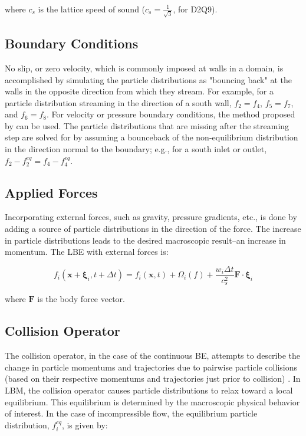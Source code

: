 \documentclass{article}
\newcommand{\pos}{\mathbf{x}}
\newcommand{\pvel}{\boldsymbol{\xi}}
\begin{document}
\noindent where $c_s$ is the lattice speed of sound ($c_s = \frac{1}{\sqrt{3}}$, for D2Q9).

\subsection{Boundary Conditions}

No slip, or zero velocity, which is commonly imposed at walls in a domain, is accomplished by simulating the particle distributions as "bouncing back" at the walls in the opposite direction from which they stream.
For example, for a particle distribution streaming in the direction of a south wall, $f_2 = f_4$, $f_5 = f_7$, and $f_6 = f_8$.
For velocity or pressure boundary conditions, the method proposed by \citet{zou1997pressure} can be used.
The particle distributions that are missing after the streaming step are solved for by assuming a bounceback of the non-equilibrium distribution in the direction normal to the boundary; e.g., for a south inlet or outlet, $f_2 - f_2^{eq} = f_4 - f_4^{eq}$.

\subsection{Applied Forces}

Incorporating external forces, such as gravity, pressure gradients, etc., is done by adding a source of particle distributions in the direction of the force.
The increase in particle distributions leads to the desired macroscopic result--an increase in momentum.
The LBE with external forces is:

\begin{equation}
f_i(\pos + \pvel_i, t + \Delta t) = f_i(\pos, t) + \Omega_i(f) + \frac{w_i \Delta t}{c_s^2} \mathbf{F} \cdot \pvel_i
\end{equation}

\noindent where $\mathbf{F}$ is the body force vector.

\subsection{Collision Operator} %

The collision operator, in the case of the continuous BE, attempts to describe the change in particle momentums and trajectories due to pairwise particle collisions (based on their respective momentums and trajectories just prior to collision) \cite{Cer90}.
In LBM, the collision operator causes particle distributions to relax toward a local equilibrium. This equilibrium is determined by the macroscopic physical behavior of interest.
In the case of incompressible flow, the equilibrium particle distribution, $f_i^{eq}$, is given by:
\end{document}
